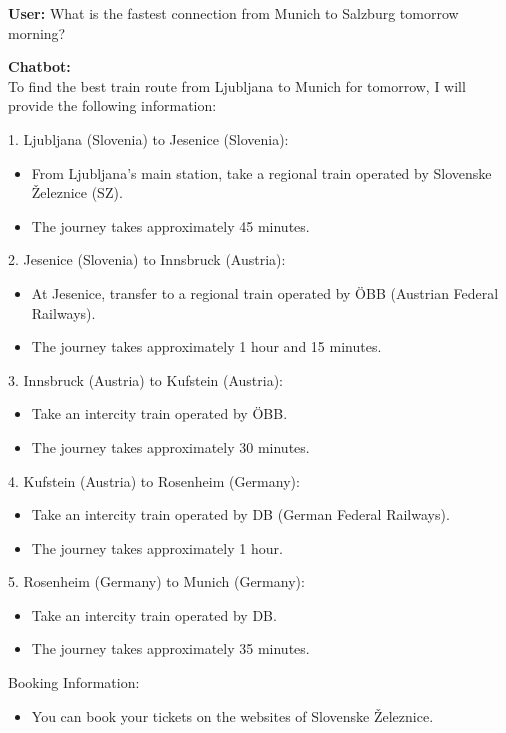 \documentclass[fleqn,moreauthors,10pt]{ds_report}
\begin{document}
\begin{tcolorbox}[
    colback=gray!5,
    colframe=black!80,
    title=Base Model Output - Train Schedule,
    arc=2mm
]

\textbf{User:} What is the fastest connection from Munich to Salzburg tomorrow morning?

\vspace{0.3cm}

\textbf{Chatbot:} \\
To find the best train route from Ljubljana to Munich for tomorrow, I will provide the following information:

1. Ljubljana (Slovenia) to Jesenice (Slovenia):
\begin{itemize}
    \item From Ljubljana's main station, take a regional train operated by Slovenske Železnice (SZ).
    \item The journey takes approximately 45 minutes.
\end{itemize}

2. Jesenice (Slovenia) to Innsbruck (Austria):
\begin{itemize}
    \item At Jesenice, transfer to a regional train operated by ÖBB (Austrian Federal Railways).
    \item The journey takes approximately 1 hour and 15 minutes.
\end{itemize}

3. Innsbruck (Austria) to Kufstein (Austria):
\begin{itemize}
    \item Take an intercity train operated by ÖBB.
    \item The journey takes approximately 30 minutes.
\end{itemize}

4. Kufstein (Austria) to Rosenheim (Germany):
\begin{itemize}
    \item Take an intercity train operated by DB (German Federal Railways).
    \item The journey takes approximately 1 hour.
\end{itemize}

5. Rosenheim (Germany) to Munich (Germany):
\begin{itemize}
    \item Take an intercity train operated by DB.
    \item The journey takes approximately 35 minutes.
\end{itemize}


Booking Information:

\begin{itemize}
    \item You can book your tickets on the websites of Slovenske Železnice.
\end{itemize}

\end{tcolorbox}
\end{document}
